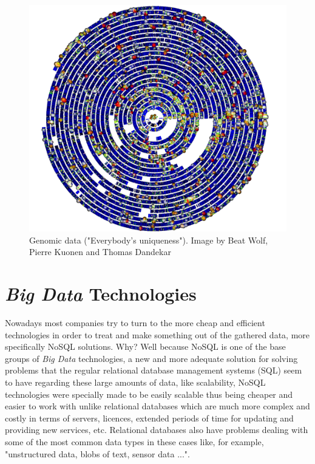 \documentclass{llncs}
\begin{document}

\begin{figure}[ht!]
\centering
\includegraphics[scale=0.3]{genomic_data.png}
\caption{Genomic data ("Everybody’s uniqueness"). Image by Beat Wolf, Pierre Kuonen and Thomas Dandekar ~\cite{Tressider2014}}
\label{fig:minipage1}
\end{figure}


\section{\textit{Big Data} Technologies}

Nowadays most companies try to turn to the more cheap and efficient technologies in order to treat and make something out of the gathered data, more specifically NoSQL solutions. Why? Well because NoSQL is one of the base groups of \textit{Big Data} technologies, a new and more adequate solution for solving problems that the regular relational database management systems (SQL) seem to have regarding these large amounts of data, like scalability, NoSQL technologies were specially made to be easily scalable thus being cheaper and easier to work with unlike relational databases which are much more complex and costly in terms of servers, licences, extended periods of time for updating and providing new services, etc. Relational databases also have problems dealing with some of the most common data types in these cases like, for example, "unstructured data, blobs of text, sensor data ...".~\cite{Hirleman2014}~\cite{Kelly2013}~\cite{Dix2014}\\ 
\end{document}
